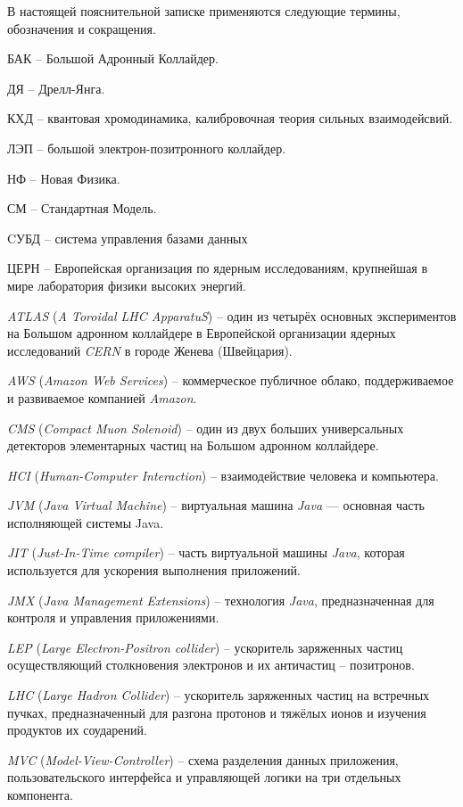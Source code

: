 В настоящей пояснительной записке применяются следующие термины, обозначения и сокращения.

БАК -- Большой Адронный Коллайдер.

ДЯ -- Дрелл-Янга.

КХД -- квантовая хромодинамика, калибровочная теория сильных взаимодейсвий.

ЛЭП -- большой электрон-позитронного коллайдер.

НФ -- Новая Физика.

СМ -- Стандартная Модель.

CУБД -- система управления базами данных

ЦЕРН -- Европейская организация по ядерным исследованиям, крупнейшая в мире лаборатория физики высоких энергий.

\textit{ATLAS} (\textit{A Toroidal LHC ApparatuS}) -- один из четырёх основных экспериментов на Большом адронном коллайдере в Европейской организации ядерных исследований \textit{CERN} в городе Женева (Швейцария).

\textit{AWS} (\textit{Amazon Web Services}) -- коммерческое публичное облако, поддерживаемое и развиваемое компанией \textit{Amazon}.

\textit{CMS} (\textit{Compact Muon Solenoid}) -- один из двух больших универсальных детекторов элементарных частиц на Большом адронном коллайдере.

\textit{HCI} (\textit{Human-Computer Interaction}) -- взаимодействие человека и компьютера.

\textit{JVM} (\textit{Java Virtual Machine}) -- виртуальная машина \textit{Java} — основная часть исполняющей системы Java.

\textit{JIT} (\textit{Just-In-Time compiler}) -- часть виртуальной машины \textit{Java}, которая используется для ускорения выполнения приложений.

\textit{JMX} (\textit{Java Management Extensions}) -- технология \textit{Java}, предназначенная для контроля и управления приложениями.

\textit{LEP} (\textit{Large Electron-Positron collider}) -- ускоритель заряженных частиц осуществляющий столкновения электронов и их античастиц -- позитронов.

\textit{LHC} (\textit{Large Hadron Collider}) --  ускоритель заряженных частиц на встречных пучках, предназначенный для разгона протонов и тяжёлых ионов и изучения продуктов их соударений.

\textit{MVC} (\textit{Model-View-Controller}) -- схема разделения данных приложения, пользовательского интерфейса и управляющей логики на три отдельных компонента.

